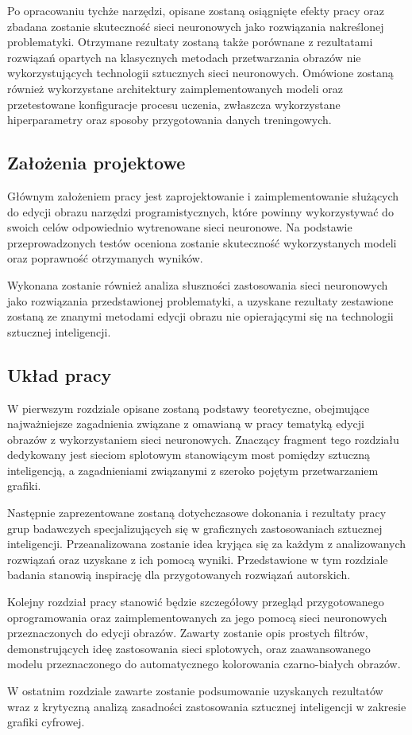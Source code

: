     Po opracowaniu tychże narzędzi, opisane zostaną osiągnięte efekty pracy oraz
    zbadana zostanie skuteczność sieci neuronowych jako rozwiązania nakreślonej
    problematyki. Otrzymane rezultaty zostaną także porównane z rezultatami
    rozwiązań opartych na klasycznych metodach przetwarzania obrazów nie
    wykorzystujących technologii sztucznych sieci neuronowych.
    Omówione zostaną również wykorzystane architektury zaimplementowanych
    modeli oraz przetestowane konfiguracje procesu uczenia, zwłaszcza wykorzystane
    hiperparametry oraz sposoby przygotowania danych treningowych.

  \subsection{Założenia projektowe}

    Głównym założeniem pracy jest zaprojektowanie i zaimplementowanie
    służących do edycji obrazu narzędzi programistycznych, które powinny
    wykorzystywać do swoich celów odpowiednio wytrenowane sieci neuronowe.
    Na podstawie przeprowadzonych testów oceniona zostanie skuteczność
    wykorzystanych modeli oraz poprawność otrzymanych wyników.

    Wykonana zostanie również analiza słuszności zastosowania sieci
    neuronowych jako rozwiązania przedstawionej problematyki, a uzyskane
    rezultaty zestawione zostaną ze znanymi metodami edycji
    obrazu nie opierającymi się na technologii sztucznej inteligencji.

  \subsection{Układ pracy}

    W pierwszym rozdziale opisane zostaną podstawy teoretyczne, obejmujące najważniejsze
    zagadnienia związane z omawianą w pracy tematyką edycji obrazów z
    wykorzystaniem sieci neuronowych. Znaczący fragment tego rozdziału dedykowany
    jest sieciom splotowym stanowiącym most pomiędzy sztuczną
    inteligencją, a zagadnieniami związanymi z szeroko pojętym przetwarzaniem
    grafiki.

    Następnie zaprezentowane zostaną dotychczasowe dokonania i rezultaty pracy
    grup badawczych specjalizujących się w graficznych zastosowaniach sztucznej
    inteligencji.
    Przeanalizowana zostanie idea kryjąca się za każdym z analizowanych
    rozwiązań oraz uzyskane z ich pomocą wyniki.
    Przedstawione w tym rozdziale badania stanowią inspirację dla przygotowanych
    rozwiązań autorskich.

    Kolejny rozdział pracy stanowić będzie szczegółowy przegląd przygotowanego
    oprogramowania oraz zaimplementowanych za jego pomocą sieci neuronowych
    przeznaczonych do edycji obrazów. Zawarty zostanie opis prostych filtrów,
    demonstrujących ideę zastosowania sieci splotowych, oraz zaawansowanego
    modelu przeznaczonego do automatycznego kolorowania czarno-białych obrazów.

    W ostatnim rozdziale zawarte zostanie podsumowanie uzyskanych rezultatów wraz
    z krytyczną analizą zasadności zastosowania sztucznej inteligencji w
    zakresie grafiki cyfrowej.
